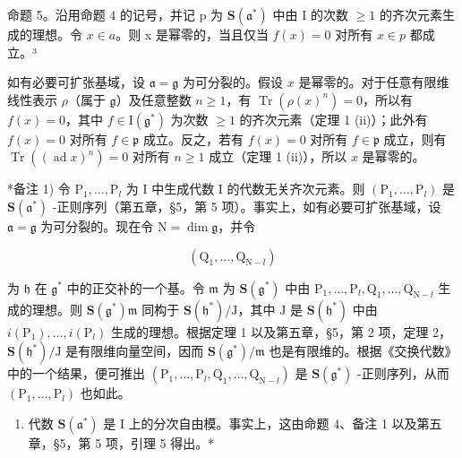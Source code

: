 命题 5。沿用命题 4 的记号，并记 p 为 \(\mathbf{S}(\mathfrak{a}^{*})\) 中由 I 的次数 \(\geq 1\) 的齐次元素生成的理想。令 \(x \in a\)。则 x 是幂零的，当且仅当 \(f(x) = 0\) 对所有 \(x \in p\) 都成立。³

如有必要可扩张基域，设 \(\mathfrak{a} = \mathfrak{g}\) 为可分裂的。假设 \(x\) 是幂零的。对于任意有限维线性表示 \(\rho\)（属于 \(\mathfrak{g}\)）及任意整数 \(n \geq 1\)，有 \(\operatorname{Tr}(\rho(x)^n) = 0\)，所以有 \(f(x) = 0\)，其中 \(f \in \mathrm{I}(\mathfrak{g}^*)\) 为次数 \(\geq 1\) 的齐次元素（定理 1 (ii)）；此外有 \(f(x) = 0\) 对所有 \(f \in \mathfrak{p}\) 成立。反之，若有 \(f(x) = 0\) 对所有 \(f \in \mathfrak{p}\) 成立，则有 \(\operatorname{Tr}((\operatorname{ad} x)^n) = 0\) 对所有 \(n \geq 1\) 成立（定理 1 (ii)），所以 \(x\) 是幂零的。

*备注 1) 令 \(\mathrm{P}_1, \ldots, \mathrm{P}_l\) 为 I 中生成代数 I 的代数无关齐次元素。则 \((\mathrm{P}_1, \ldots, \mathrm{P}_l)\) 是 \(\mathbf{S}(\mathfrak{a}^*)\) -正则序列（第五章，§5，第 5 项）。事实上，如有必要可扩张基域，设 \(\mathfrak{a} = \mathfrak{g}\) 为可分裂的。现在令 \(\mathrm{N} = \dim \mathfrak{g}\)，并令

\[
\left(\mathrm{Q} _ {1}, \dots , \mathrm{Q} _ {\mathrm{N} - l}\right)
\]

为 \(\mathfrak{h}\) 在 \(\mathfrak{g}^*\) 中的正交补的一个基。令 \(\mathfrak{m}\) 为 \(\mathbf{S}(\mathfrak{g}^*)\) 中由 \(\mathrm{P}_1, \ldots, \mathrm{P}_l, \mathrm{Q}_1, \ldots, \mathrm{Q}_{\mathrm{N}-l}\) 生成的理想。则 \(\mathbf{S}(\mathfrak{g}^*)\mathfrak{m}\) 同构于 \(\mathbf{S}(\mathfrak{h}^*)/\mathrm{J}\)，其中 \(\mathrm{J}\) 是 \(\mathbf{S}(\mathfrak{h}^*)\) 中由 \(i(\mathrm{P}_1), \ldots, i(\mathrm{P}_l)\) 生成的理想。根据定理 1 以及第五章，§5，第 2 项，定理 2，\(\mathbf{S}(\mathfrak{h}^*)/\mathrm{J}\) 是有限维向量空间，因而 \(\mathbf{S}(\mathfrak{g}^*)/\mathfrak{m}\) 也是有限维的。根据《交换代数》中的一个结果，便可推出 \((\mathrm{P}_1, \ldots, \mathrm{P}_l, \mathrm{Q}_1, \ldots, \mathrm{Q}_{\mathrm{N}-l})\) 是 \(\mathbf{S}(\mathfrak{g}^*)\) -正则序列，从而 \((\mathrm{P}_1, \ldots, \mathrm{P}_l)\) 也如此。

\begin{enumerate}
\def\labelenumi{\arabic{enumi})}
\setcounter{enumi}{1}
\tightlist
\item
  代数 \(\mathbf{S}(\mathfrak{a}^*)\) 是 I 上的分次自由模。事实上，这由命题 4、备注 1 以及第五章，§5，第 5 项，引理 5 得出。*
\end{enumerate}

